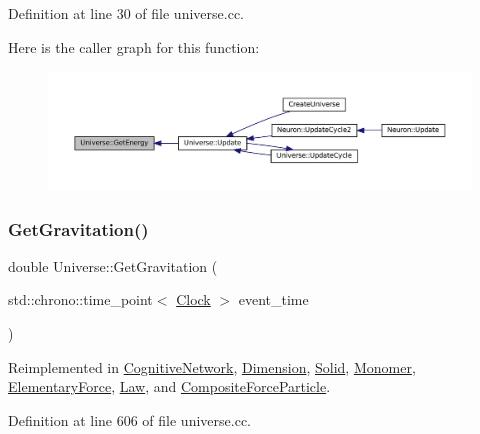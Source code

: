 Definition at line 30 of file universe.\+cc.

Here is the caller graph for this function\+:\nopagebreak
\begin{figure}[H]
\begin{center}
\leavevmode
\includegraphics[width=350pt]{class_universe_a3b25e7ce6552991b7d5e6a9eb6e8a7ff_icgraph}
\end{center}
\end{figure}
\mbox{\label{class_universe_ab0404e774ee0ed66b597ff5b8e989446}} 
\subsubsection{\texorpdfstring{Get\+Gravitation()}{GetGravitation()}}
{\footnotesize\ttfamily double Universe\+::\+Get\+Gravitation (\begin{DoxyParamCaption}\item[{std\+::chrono\+::time\+\_\+point$<$ \mbox{\hyperlink{universe_8h_a0ef8d951d1ca5ab3cfaf7ab4c7a6fd80}{Clock}} $>$}]{event\+\_\+time }\end{DoxyParamCaption})\hspace{0.3cm}{\ttfamily [virtual]}}



Reimplemented in \mbox{\hyperlink{class_cognitive_network_a4b5150310288c52f00ecb745ae9e7f86}{Cognitive\+Network}}, \mbox{\hyperlink{class_dimension_a652220a2eb1b26c749ad032865d81788}{Dimension}}, \mbox{\hyperlink{class_solid_ab5ecb5598be93fe3cd2a21c0cfd363c8}{Solid}}, \mbox{\hyperlink{class_monomer_aa5f7b901e15c9a9eb6e1c3564cd06e4f}{Monomer}}, \mbox{\hyperlink{class_elementary_force_a579afb8079668f0587096934d1de9c04}{Elementary\+Force}}, \mbox{\hyperlink{class_law_a84bdc0c2ca97a9c19422018ff761b992}{Law}}, and \mbox{\hyperlink{class_composite_force_particle_a06483dc73c156679f34acf85aa5f924e}{Composite\+Force\+Particle}}.



Definition at line 606 of file universe.\+cc.

